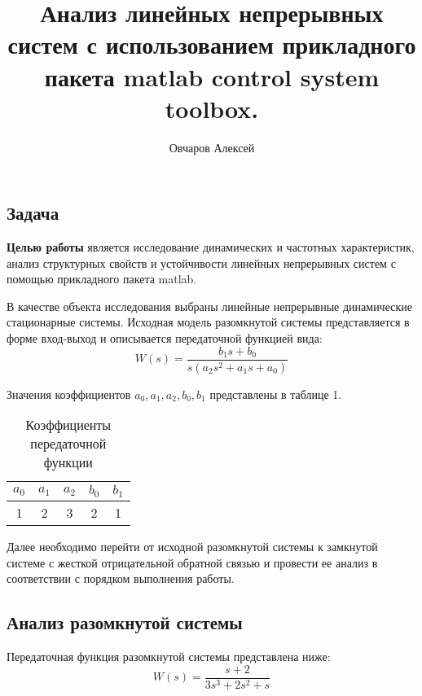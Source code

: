 \documentclass[a4paper, 12pt]{article}
\author{Овчаров Алексей}
\title{Анализ линейных непрерывных систем с использованием прикладного пакета matlab control system 
toolbox.}
\begin{document}
\maketitle

\begin{center}
\section{Задача}
\end{center} \par
\textbf{Целью работы} является исследование динамических и частотных характеристик, анализ структурных свойств и устойчивости линейных непрерывных систем с помощью прикладного пакета matlab. \par
В качестве объекта исследования выбраны линейные непрерывные динамические стационарные системы. Исходная модель разомкнутой системы представляется в форме вход-выход и описывается передаточной функцией вида: 
\begin{equation} 
    W(s) = \frac{b_1s + b_0}{s(a_2s^2 + a_1s + a_0)}
\end{equation} \par
Значения коэффициентов $a_0, a_1, a_2, b_0, b_1$ представлены в таблице 1. \par
\begin{table} [h!]
    \centering
    \begin{threeparttable}
        \caption{Коэффициенты передаточной функции}
        \begin{tabular}{|c|c|c|c|c|}
            \hline
            $a_0$ & $a_1$ & $a_2$ & $b_0$ & $b_1$ \\ \hline
            1 & 2 & 3 & 2 & 1 \\ \hline
        \end{tabular}
    \end{threeparttable}
\end{table}
Далее необходимо перейти от исходной разомкнутой системы к замкнутой системе с жесткой отрицательной обратной связью и провести ее анализ в соответствии с порядком выполнения работы.

\newpage
\begin{center}
\section{Анализ разомкнутой системы}
\end{center} \par
Передаточная функция разомкнутой системы представлена ниже:
\begin{equation}
    W(s) = \frac{s + 2}{3s^3 + 2s^2 + s}
\end{equation}
\end{document}
